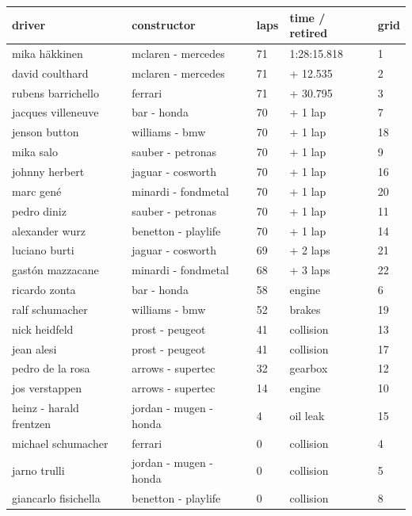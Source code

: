 \documentclass{article}
\begin{document}
\begin{tabular}{lllll}
\toprule
driver & constructor & laps & time / retired & grid \\
\midrule
mika häkkinen & mclaren - mercedes & 71 & 1:28:15.818 & 1 \\
david coulthard & mclaren - mercedes & 71 & + 12.535 & 2 \\
rubens barrichello & ferrari & 71 & + 30.795 & 3 \\
jacques villeneuve & bar - honda & 70 & + 1 lap & 7 \\
jenson button & williams - bmw & 70 & + 1 lap & 18 \\
mika salo & sauber - petronas & 70 & + 1 lap & 9 \\
johnny herbert & jaguar - cosworth & 70 & + 1 lap & 16 \\
marc gené & minardi - fondmetal & 70 & + 1 lap & 20 \\
pedro diniz & sauber - petronas & 70 & + 1 lap & 11 \\
alexander wurz & benetton - playlife & 70 & + 1 lap & 14 \\
luciano burti & jaguar - cosworth & 69 & + 2 laps & 21 \\
gastón mazzacane & minardi - fondmetal & 68 & + 3 laps & 22 \\
ricardo zonta & bar - honda & 58 & engine & 6 \\
ralf schumacher & williams - bmw & 52 & brakes & 19 \\
nick heidfeld & prost - peugeot & 41 & collision & 13 \\
jean alesi & prost - peugeot & 41 & collision & 17 \\
pedro de la rosa & arrows - supertec & 32 & gearbox & 12 \\
jos verstappen & arrows - supertec & 14 & engine & 10 \\
heinz - harald frentzen & jordan - mugen - honda & 4 & oil leak & 15 \\
michael schumacher & ferrari & 0 & collision & 4 \\
jarno trulli & jordan - mugen - honda & 0 & collision & 5 \\
giancarlo fisichella & benetton - playlife & 0 & collision & 8 \\
\bottomrule
\end{tabular}
\end{document}
